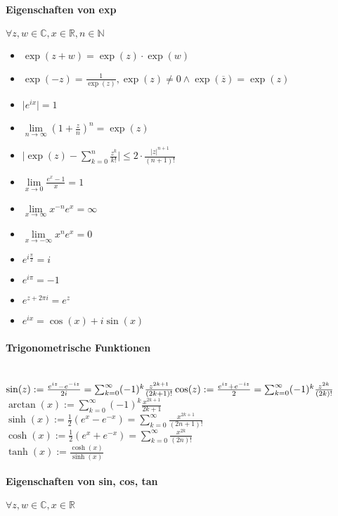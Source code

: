 \documentclass[paper=a3,paper=landscape, fontsize=9pt, DIV=30]{scrartcl}
\newcommand{\real}{{\mathbb{R}}}
\newcommand{\compl}{\mathbb{C}}
\newcommand{\nat}{\mathbb{N}}
\begin{document}
\begin{multicols*}{4}
  \paragraph{Eigenschaften von exp}
  $\forall z,w \in \compl, x \in \real, n \in \nat$
  \begin{itemize}
  \item $\exp(z+w)=\exp(z)\cdot \exp(w)$
  \item $\exp(-z)=\frac{1}{\exp(z)}, \exp(z) \neq 0 \wedge \exp(\overline{z})=\exp(z)$
  \item $\lvert e^{ix} \rvert = 1$
  \item $\lim\limits_{n \rightarrow \infty} (1+\frac{z}{n})^n=\exp(z)$
  \item $ \lvert \exp(z)- \sum_{k=0}^{n} \frac{z^k}{k!} \rvert \leq 2 \cdot \frac{\lvert z \rvert ^{n+1}}{(n+1)!}$
  \item $ \lim\limits_{x \rightarrow 0} \frac{e^x-1}{x} = 1$
  \item $ \lim\limits_{x \rightarrow \infty} x^{-n}e^x=\infty$
  \item $ \lim\limits_{x \rightarrow -\infty} x^ne^x=0$
  \item $e^{i \frac{\pi}{2}} = i$
  \item $e^{i\pi}=-1$
  \item $e^{z+2\pi i}=e^z$
  \item $e^{ix}=\cos(x)+i\sin(x)$
  \end{itemize}


  \paragraph{Trigonometrische Funktionen}\hspace{0pt} \\
  $\sin(z):=\frac{e^{iz}-e^{-iz}}{2i} = \sum_{k=0}^{\infty} (-1)^k \frac{z^{2k+1}}{(2k+1)!}\\
  \cos(z):=\frac{e^{iz}+e^{-iz}}{2} = \sum_{k=0}^{\infty} (-1)^k\frac{z^{2k}}{(2k)!}$\\
  $\arctan(x):=\sum_{k=0}^{\infty}(-1)^k \frac{x^{2k+1}}{2k+1}$\\
  $\sinh(x):=\frac{1}{2}(e^x-e^{-x})=\sum_{k=0}^{\infty}\frac{x^{2k+1}}{(2n+1)!}$\\
  $\cosh(x):=\frac{1}{2}(e^x+e^{-x})=\sum_{k=0}^{\infty}\frac{x^{2k}}{(2n)!}$\\
  $\tanh(x):=\frac{\cosh(x)}{\sinh(x)}$

  \paragraph{Eigenschaften von sin, cos, tan}
  $\forall z,w \in \compl, x \in \real$


\end{multicols*}
\end{document}
